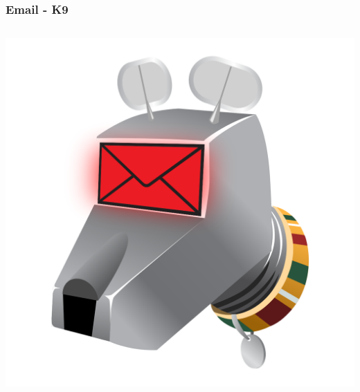 \begin{frame}

    \frametitle{Email - K9}

    \begin{columns}[c]
            \begin{center}
                \includegraphics[height=0.15\textheight]{images/k9-logo.png}

\end{center}
\end{columns}
\end{frame}
